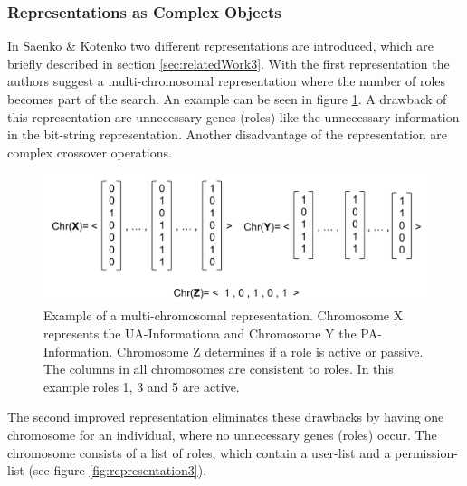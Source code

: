         \subsubsection{Representations as Complex Objects}
        In Saenko \& Kotenko\cite{saenko2012design} two different representations are introduced, which are briefly described in section \ref{sec:relatedWork3}. With the first representation the authors suggest a multi-chromosomal representation where the number of roles becomes part of the search. An example can be seen in figure \ref{fig:representation2}. A drawback of this representation are unnecessary genes (roles) like the unnecessary information in the bit-string representation. Another disadvantage of the representation are complex crossover operations\cite{saenko2012design}.
        \begin{figure}
            \centering
            \includegraphics[scale=0.5]{./Figures/ComplexRepresentation1}
            \caption{Example of a multi-chromosomal representation. Chromosome X represents the UA-Informationa and Chromosome Y the PA-Information. Chromosome Z determines if a role is active or passive. The columns in all chromosomes are consistent to roles. In this example roles 1, 3 and 5 are active.}
            \label{fig:representation2}
        \end{figure}
        The second improved representation eliminates these drawbacks by having one chromosome for an individual, where no unnecessary genes (roles) occur. The chromosome consists of a list of roles, which contain a user-list and a permission-list (see figure \ref{fig:representation3}).\\
